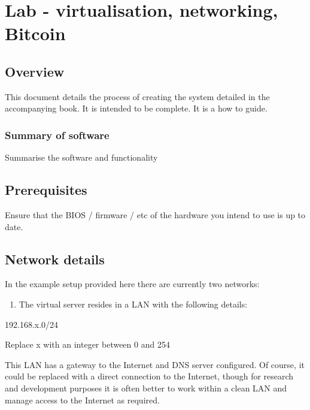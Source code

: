 \hypertarget{lab---virtualisation-networking-bitcoin}{%
\section{Lab - virtualisation, networking,
Bitcoin}\label{lab---virtualisation-networking-bitcoin}}

\hypertarget{overview}{%
\subsection{Overview}\label{overview}}

This document details the process of creating the system detailed in the
accompanying book. It is intended to be complete. It is a how to guide.

\hypertarget{summary-of-software}{%
\subsubsection{Summary of software}\label{summary-of-software}}

Summarise the software and functionality

\hypertarget{prerequisites}{%
\subsection{Prerequisites}\label{prerequisites}}

Ensure that the BIOS / firmware / etc of the hardware you intend to use
is up to date.

\hypertarget{network-details}{%
\subsection{Network details}\label{network-details}}

In the example setup provided here there are currently two networks:

\begin{enumerate}
\def\labelenumi{\arabic{enumi}.}
\tightlist
\item
  The virtual server resides in a LAN with the following details:
\end{enumerate}

192.168.x.0/24

Replace x with an integer between 0 and 254

This LAN has a gateway to the Internet and DNS server configured. Of
course, it could be replaced with a direct connection to the Internet,
though for research and development purposes it is often better to work
within a clean LAN and manage access to the Internet as required.


